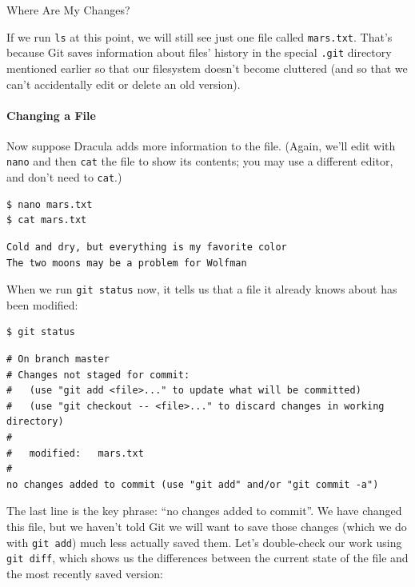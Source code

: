 \documentclass{book}
\begin{document}
\begin{swcbox}{Where Are My Changes?}

If we run \texttt{ls} at this point, we will still see just one file
called \texttt{mars.txt}. That's because Git saves information about
files' history in the special \texttt{.git} directory mentioned earlier
so that our filesystem doesn't become cluttered (and so that we can't
accidentally edit or delete an old version).

\end{swcbox}

\mbox{}\paragraph{Changing a File}

Now suppose Dracula adds more information to the file. (Again, we'll
edit with \texttt{nano} and then \texttt{cat} the file to show its
contents; you may use a different editor, and don't need to
\texttt{cat}.)

\begin{verbatim}
$ nano mars.txt
$ cat mars.txt
\end{verbatim}

\begin{verbatim}
Cold and dry, but everything is my favorite color
The two moons may be a problem for Wolfman
\end{verbatim}

When we run \texttt{git status} now, it tells us that a file it already
knows about has been modified:

\begin{verbatim}
$ git status
\end{verbatim}

\begin{verbatim}
# On branch master
# Changes not staged for commit:
#   (use "git add <file>..." to update what will be committed)
#   (use "git checkout -- <file>..." to discard changes in working directory)
#
#   modified:   mars.txt
#
no changes added to commit (use "git add" and/or "git commit -a")
\end{verbatim}

The last line is the key phrase: ``no changes added to commit''. We have
changed this file, but we haven't told Git we will want to save those
changes (which we do with \texttt{git add}) much less actually saved
them. Let's double-check our work using \texttt{git diff}, which shows
us the differences between the current state of the file and the most
recently saved version:
\end{document}
